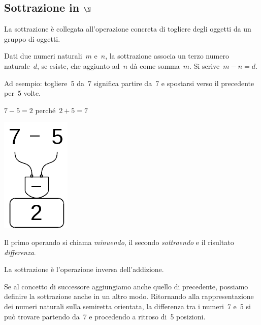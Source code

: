 \subsection{Sottrazione in $\N$}

La sottrazione è collegata all'operazione concreta di togliere degli oggetti 
da un gruppo di oggetti.

\begin{definizione}
Dati due numeri naturali~\(m\) e~\(n\), la sottrazione associa un terzo 
numero 
naturale~\(d\), se esiste, che aggiunto ad~\(n\) dà come somma~\(m\).
Si scrive~\(m - n = d\).
\end{definizione}

Ad esempio: togliere~5 da~7 significa partire da~7 e spostarsi verso il 
precedente per~5 volte.

\begin{minipage}{0.80\textwidth}
 \centering
 \(7-5=2\) perché~\(2+5=7\)

 
\end{minipage}%
\begin{minipage}{0.15\textwidth}
 \centering
\begin{inaccessibleblock}
 \includegraphics[scale=0.35]{img/op_sot.png}
\end{inaccessibleblock}
\end{minipage}%

Il primo operando si chiama \emph{minuendo}, il secondo \emph{sottraendo} e 
il risultato \emph{differenza}.

La sottrazione è l'operazione inversa dell'addizione.

Se al concetto di successore aggiungiamo anche quello di precedente, 
possiamo definire la sottrazione anche in un altro modo.
Ritornando alla rappresentazione dei numeri naturali sulla semiretta 
orientata, la differenza tra i numeri~7 e~5 si può trovare partendo da~7 e 
procedendo a ritroso di~5 posizioni.

